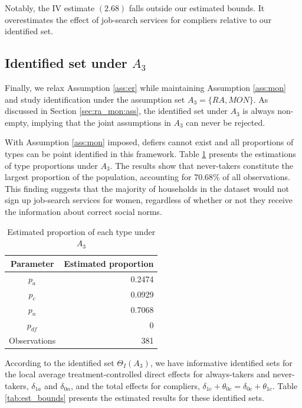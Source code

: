 \documentclass[12pt]{article}
\theoremstyle{plain}
\theoremstyle{definition}
\theoremstyle{remark}
\begin{document}
Notably, the IV estimate $(2.68)$ falls outside our estimated bounds. It overestimates the effect of job-search services for compliers relative to our identified set.

\subsection{Identified set under $A_3$}
Finally, we relax Assumption \ref{ass:er} while maintaining Assumption \ref{ass:mon} and study identification under the assumption set $A_3 = \{RA, MON\}$. As discussed in Section \ref{sec:ra_mon:ass}, the identified set under $A_3$ is always non-empty, implying that the joint assumptions in $A_3$ can never be rejected.

With Assumption \ref{ass:mon} imposed, defiers cannot exist and all proportions of types can be point identified in this framework. Table \ref{tab:type_prop} presents the estimations of type proportions under $A_3$. The results show that never-takers constitute the largest proportion of the population, accounting for 70.68\% of all observations. This finding suggests that the majority of households in the dataset would not sign up job-search services for women, regardless of whether or not they receive the information about correct social norms.

\begin{table}
    \centering
    \caption{Estimated proportion of each type under $A_3$}
      \begin{tabular}{cr}
      \toprule
      \multicolumn{1}{c}{Parameter} & \multicolumn{1}{c}{Estimated proportion} \\
      \midrule
      $p_a$ & 0.2474 \\
      $p_c$ & 0.0929 \\
      $p_n$ & 0.7068 \\
       $p_{df}$    & 0 \\
      Observations & 381 \\
      \bottomrule
      \end{tabular}%
    \label{tab:type_prop}%
\end{table}%

According to the identified set $\Theta_I(A_3)$, we have informative identified sets for the local average treatment-controlled direct effects for always-takers and never-takers, $\delta_{1a}$ and $\delta_{0n}$, and the total effects for compliers, $\delta_{1c} + \theta_{0c} = \delta_{0c} + \theta_{1c}$. Table \ref{tab:est_bounds} presents the estimated results for these identified sets.
\end{document}
